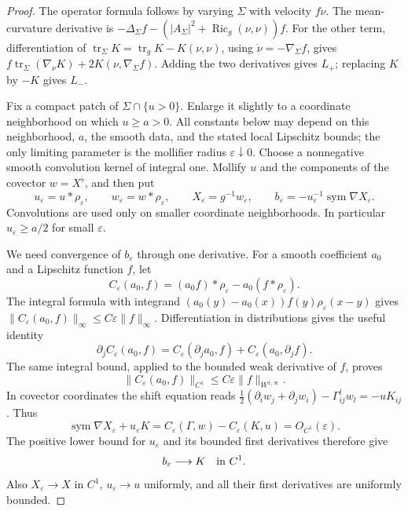 \begin{proof}
The operator formula follows by varying $\Sigma$ with velocity $f\nu$.
The mean-curvature derivative is
$-\Delta_\Sigma f-(|A_\Sigma|^2+\operatorname{Ric}_g(\nu,\nu))f$.
For the other term, differentiation of
$\operatorname{tr}_\Sigma K=\operatorname{tr}_gK-K(\nu,\nu)$, using
$\dot\nu=-\nabla_\Sigma f$, gives
$f\operatorname{tr}_\Sigma(\nabla_\nu K)
 +2K(\nu,\nabla_\Sigma f)$.  Adding the two derivatives gives $L_+$;
replacing $K$ by $-K$ gives $L_-$.

Fix a compact patch of $\Sigma\cap\{u>0\}$.  Enlarge it slightly to
a coordinate neighborhood on which $u\geq a>0$.  All constants below
may depend on this neighborhood, $a$, the smooth data, and the stated
local Lipschitz bounds; the only limiting parameter is the mollifier
radius $\varepsilon\downarrow0$.  Choose a nonnegative smooth
convolution kernel of integral one.  Mollify $u$ and the components
of the covector $w=X^\flat$, and then put
\[
 u_\varepsilon=u*\rho_\varepsilon,\qquad
 w_\varepsilon=w*\rho_\varepsilon,\qquad
 X_\varepsilon=g^{-1}w_\varepsilon,
 \qquad b_\varepsilon=-u_\varepsilon^{-1}
                    \operatorname{sym}\nabla X_\varepsilon.
\]
Convolutions are used only on smaller coordinate neighborhoods.
In particular $u_\varepsilon\geq a/2$ for small $\varepsilon$.

We need convergence of $b_\varepsilon$ through one derivative.
For a smooth coefficient $a_0$ and a Lipschitz function $f$, let
\[
 C_\varepsilon(a_0,f)=(a_0f)*\rho_\varepsilon
                              -a_0(f*\rho_\varepsilon).
\]
The integral formula with integrand
$(a_0(y)-a_0(x))f(y)\rho_\varepsilon(x-y)$ gives
$\|C_\varepsilon(a_0,f)\|_\infty\leq C\varepsilon\|f\|_\infty$.
Differentiation in distributions gives the useful identity
\[
 \partial_j C_\varepsilon(a_0,f)
    =C_\varepsilon(\partial_j a_0,f)
                         +C_\varepsilon(a_0,\partial_jf).
\]
The same integral bound, applied to the bounded weak derivative of
$f$, proves
\[
 \|C_\varepsilon(a_0,f)\|_{C^1}
       \leq C\varepsilon\|f\|_{W^{1,\infty}}.
\]
In covector coordinates the shift equation reads
$\tfrac12(\partial_iw_j+\partial_jw_i)-\Gamma^l_{ij}w_l=-uK_{ij}$.
Thus
\[
 \operatorname{sym}\nabla X_\varepsilon+u_\varepsilon K
   =C_\varepsilon(\Gamma,w)-C_\varepsilon(K,u)=O_{C^1}(\varepsilon).
\]
The positive lower bound for $u_\varepsilon$ and its bounded first
derivatives therefore give
\[
 b_\varepsilon\longrightarrow K\quad\hbox{in }C^1.
\]
Also $X_\varepsilon\to X$ in $C^1$, $u_\varepsilon\to u$ uniformly,
and all their first derivatives are uniformly bounded.


\end{proof}
